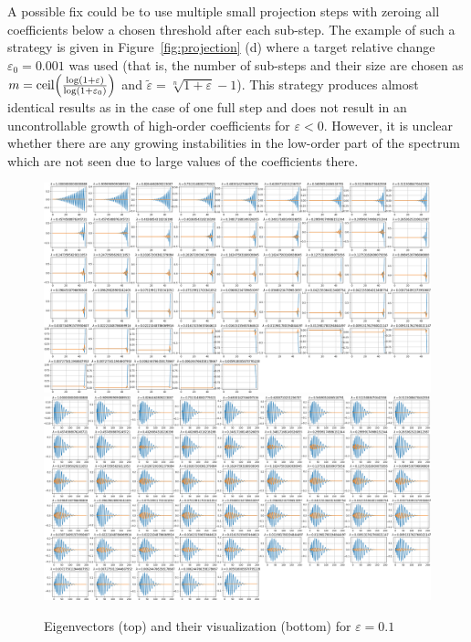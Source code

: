 \documentclass{article}[draft]
\begin{document}
A possible fix could be to use multiple small projection steps with zeroing all coefficients below a chosen threshold after each sub-step. The example of such a strategy is given in  Figure~\ref{fig:projection} (d) where a target relative change $\varepsilon_0 = 0.001$ was used (that is, the number of sub-steps and their size are chosen as $m = \text{ceil}\of{\frac{\log\of{1+\varepsilon}}{\log\of{1+\varepsilon_0}}}$ and $\tilde{\varepsilon} = \sqrt[n]{1+\varepsilon} - 1$). This strategy produces almost identical results as in the case of one full step and does not result in an uncontrollable growth of high-order coefficients for $\varepsilon < 0$. However, it is unclear whether there are any growing instabilities in the low-order part of the spectrum which are not seen due to large values of the coefficients there.


\begin{figure}[H]
\centering
\includegraphics[width=1.2\textwidth]{dat/projection_pos_eigs.png}
\includegraphics[width=1.2\textwidth]{dat/projection_pos_eigs_visual.png}
\caption{Eigenvectors (top) and their visualization (bottom) for $\varepsilon = 0.1$}
\end{figure}
\end{document}
